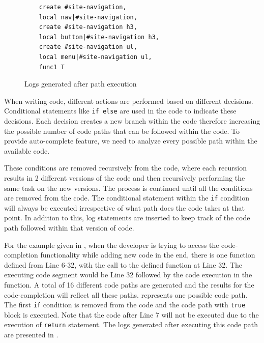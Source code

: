 			
			\begin{figure}
			\medskip
			\begin{lstlisting}
	create #site-navigation, 
	local nav|#site-navigation, 
	create #site-navigation h3, 
	local button|#site-navigation h3, 
	create #site-navigation ul, 
	local menu|#site-navigation ul, 
	func1 T 
			\end{lstlisting}
			\caption{Logs generated after path execution}
			\label{Fig:Logs}
			\end{figure}
			
		
		When writing code, different actions are performed based on different decisions. Conditional statements like \texttt{if else} are used in the code to indicate these decisions. Each decision creates a new branch within the code therefore increasing the possible number of code paths that can be followed within the code. To provide auto-complete feature, we need to analyze every possible path within the available \javascript code.
		
		These conditions are removed recursively from the code, where each recursion results in 2 different versions of the code and then recursively performing the same task on the new versions. The process is continued until all the conditions are removed from the code. The conditional statement within the \texttt{if} condition will always be executed irrespective of what path does the code takes at that point. In addition to this, log statements are inserted to keep track of the code path followed within that version of code.
		
		For the example given in , when the developer is trying to access the code-completion functionality while adding new code in the end, there is one function defined from Line 6-32, with the call to the defined function at Line 32. The executing code segment would be Line 32 followed by the code execution in the function. A total of 16 different code paths are generated and the results for the code-completion will reflect all these paths.  represents one possible code path. The first \texttt{if} condition is removed from the code and the code path with \texttt{true} block is executed. Note that the code after Line 7 will not be executed due to the execution of \texttt{return} statement. The logs generated after executing this code path are presented in .	
		
		
				

